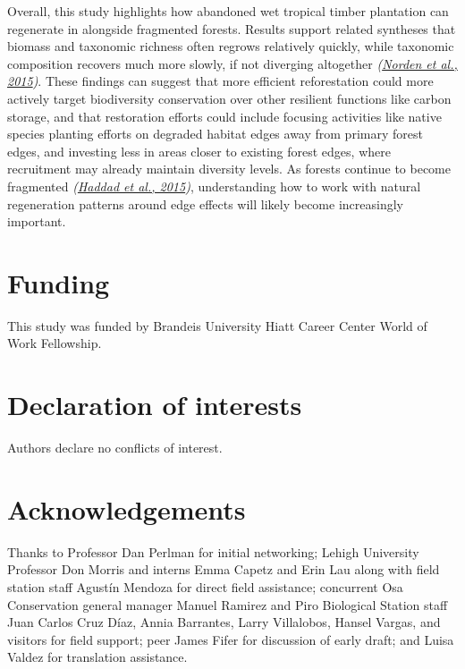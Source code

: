 \documentclass[
  12pt,
]{article}
\begin{document}
Overall, this study highlights how abandoned wet tropical timber plantation can regenerate in alongside fragmented forests.
Results support related syntheses that biomass and taxonomic richness often regrows relatively quickly,
while taxonomic composition recovers much more slowly, if not diverging altogether \emph{(\protect\hyperlink{ref-norden15}{Norden et al., 2015})}.
These findings can suggest that more efficient reforestation could more actively target biodiversity conservation over other resilient functions like carbon storage, and that restoration efforts could include focusing activities like native species planting efforts on degraded habitat edges away from primary forest edges, and investing less in areas closer to existing forest edges, where recruitment may already maintain diversity levels.
As forests continue to become fragmented \emph{(\protect\hyperlink{ref-haddad15}{Haddad et al., 2015})}, understanding how to work with natural regeneration patterns around edge effects will likely become increasingly important.

\newpage

\hypertarget{funding}{%
\section*{Funding}\label{funding}}

This study was funded by Brandeis University Hiatt Career Center World of Work Fellowship.

\hypertarget{declaration-of-interests}{%
\section*{Declaration of interests}\label{declaration-of-interests}}

Authors declare no conflicts of interest.

\hypertarget{acknowledgements}{%
\section*{Acknowledgements}\label{acknowledgements}}

Thanks to Professor Dan Perlman for initial networking;
Lehigh University Professor Don Morris and interns Emma Capetz and Erin Lau along with field station staff Agustín Mendoza for direct field assistance;
concurrent Osa Conservation general manager Manuel Ramirez and Piro Biological Station staff Juan Carlos Cruz Díaz, Annia Barrantes, Larry Villalobos, Hansel Vargas, and visitors for field support;
peer James Fifer for discussion of early draft;
and Luisa Valdez for translation assistance.
\end{document}

